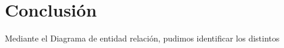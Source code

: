 \section{Conclusión}

Mediante el Diagrama de entidad relación, pudimos identificar los distintos 

